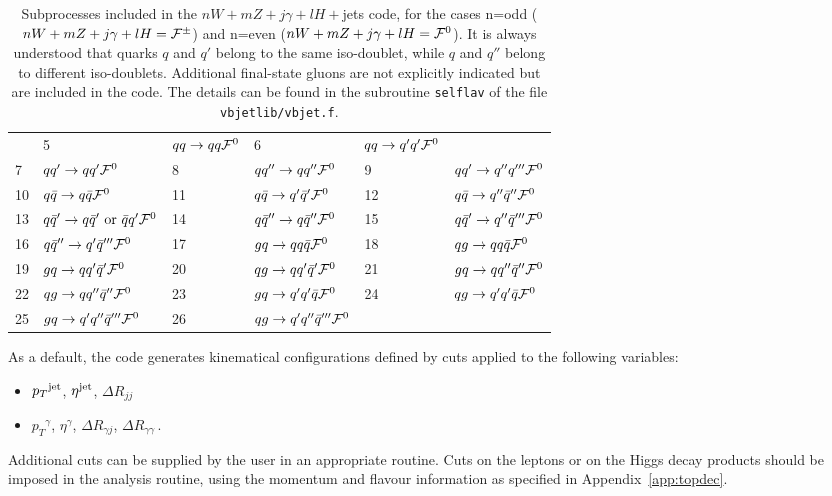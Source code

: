 \documentclass[paper]{JHEP3}
\newcommand{\ccaption}[2]{
    \begin{center}
    \parbox{0.85\textwidth}{
      \caption[#1]{\small{{#2}}}
      }
    \end{center}
    }
\def    \qbar   {\bar{q}}
\def    \pt             {\mbox{$p_T$}}
\begin{document}
\begin{table}
\begin{center}
\begin{tabular}{ll|ll|ll}
&5 &  $qq     \to q q     {\cal F}^0$ 
&6 &  $qq     \to q' q'   {\cal F}^0$ 
\\
7  &  $q q'  \to  q q'      {\cal F}^0$ 
&8 &  $q q'' \to  q q''     {\cal F}^0$ 
&9 &  $q q'  \to  q'' q'''  {\cal F}^0$ 
\\
10  &  $q \qbar \to   q \qbar     {\cal F}^0$ 
&11 &  $q \qbar \to   q' \qbar'   {\cal F}^0$ 
&12 &  $q \qbar \to   q'' \qbar'' {\cal F}^0$ 
\\
13 &   $q \qbar'  \to   q \qbar' {\rm~or~} \qbar q' {\cal F}^0$ 
&14 &  $q \qbar'' \to   q \qbar''                  {\cal F}^0$ 
&15 &  $q \qbar'  \to   q'' \qbar'''               {\cal F}^0$ 
\\
16  &  $q  \qbar'' \to q' \qbar''' {\cal F}^0$ 
&17 &  $g q  \to q q \qbar {\cal F}^0 $ 
&18 &  $q g  \to q q \qbar {\cal F}^0 $ 
\\
19 &   $g q  \to q q' \qbar' {\cal F}^0$ 
&20 &  $q g  \to q q' \qbar' {\cal F}^0$ 
&21 &  $g q  \to q q'' \qbar''{\cal F}^0 $ 
\\
  22 & $q g  \to q q'' \qbar'' {\cal F}^0$ 
& 23 & $g q  \to q' q' \qbar   {\cal F}^0$ 
& 24 & $q g  \to q' q' \qbar   {\cal F}^0$ 
\\
  25 & $g q  \to q' q'' \qbar''' {\cal F}^0$ 
& 26 & $q g  \to q' q'' \qbar''' {\cal F}^0$ 
& &
\end{tabular}
\ccaption{}{\label{tab:WZH} Subprocesses included in the 
$nW+mZ+j\gamma+lH+$jets
  code, for the cases n=odd ($nW+mZ+j\gamma+lH={\cal F}^{\pm}$)
and n=even ($nW+mZ+j\gamma+lH={\cal F}^0$).
It is always understood that quarks $q$ and $q'$ belong to the same
iso-doublet, while $q$ and $q''$ belong to different iso-doublets.
  Additional final-state
  gluons are not explicitly indicated but are included in the
  code. 
  The details can be found in the subroutine {\tt selflav} of
  the file {\tt vbjetlib/vbjet.f}.}
\end{center}
\end{table}

As a default, the code generates kinematical configurations defined by
cuts applied to the following variables:
\begin{itemize}
\item $\pt^{\rm jet}$, $\eta^{\rm jet}$, $\Delta R_{jj} \; $
\item $\pt^\gamma$, $\eta^\gamma$, $\Delta R_{\gamma j}$, 
      $\Delta R_{\gamma \gamma} \, .$
\end{itemize}
Additional cuts can be supplied by the user in an appropriate
routine. Cuts on  the leptons or on  the Higgs decay products
should be imposed in the analysis routine, using the momentum and
flavour information as specified in Appendix~\ref{app:topdec}.
\end{document}
